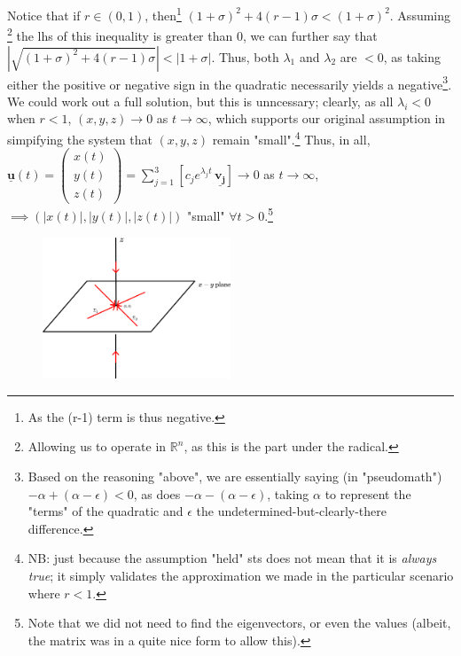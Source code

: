 \documentclass[12pt]{article}
\begin{document}
Notice that if $r \in (0,1)$, then\footnote{As the (r-1) term is thus negative.} $(1+\sigma)^2 + 4(r-1)\sigma < (1+\sigma)^2$. Assuming \footnote{Allowing us to operate in $\mathbb{R}^n$, as this is the part under the radical.} the lhs of this inequality is greater than $0$, we can further say that $\left|\sqrt{(1+\sigma)^2 + 4(r-1)\sigma }\right|< \left|1+ \sigma\right|$. Thus, both $\lambda_1$ and $\lambda_2$ are $<0$, as taking either the positive or negative sign in the quadratic necessarily yields a negative\footnote{Based on the reasoning "above", we are essentially saying (in "pseudomath") $-\alpha + (\alpha - \epsilon) < 0$, as does $-
\alpha - (\alpha - \epsilon)$, taking $\alpha$ to represent the "terms" of the quadratic and $\epsilon$ the undetermined-but-clearly-there difference.}. We could work out a full solution, but this is unncessary; clearly, as all $\lambda_i < 0$ when $r < 1$, $(x,y,z) \to 0$ as $t \to \infty$, which supports our original assumption in simpifying the system that $(x,y,z)$ remain "small".\footnote{NB: just because the assumption "held" sts does not mean that it is \textit{always true}; it simply validates the approximation we made in the particular scenario where $r < 1$.} Thus, in all, $\underline{\mathbf{u}}(t) = \begin{pmatrix}
  x(t)\\
  y(t)\\
  z(t)
\end{pmatrix} = \sum_{j=1}^{3}\left[c_j e^{\lambda_j t}\,\underline{\mathbf{v_j}}\right] \to 0$ as $t \to \infty$, $\implies \left(\left|x(t)\right|,\left|y(t)\right|,\left|z(t)\right|\right)$ "small" $\forall t > 0$.\footnote{Note that we did not need to find the eigenvectors, or even the values (albeit, the matrix was in a quite nice form to allow this).}

\begin{figure}[!h]
  \centering
  \includegraphics*[width=0.5\textwidth]{figures/rlessthan1.png}
\end{figure}
\end{document}
